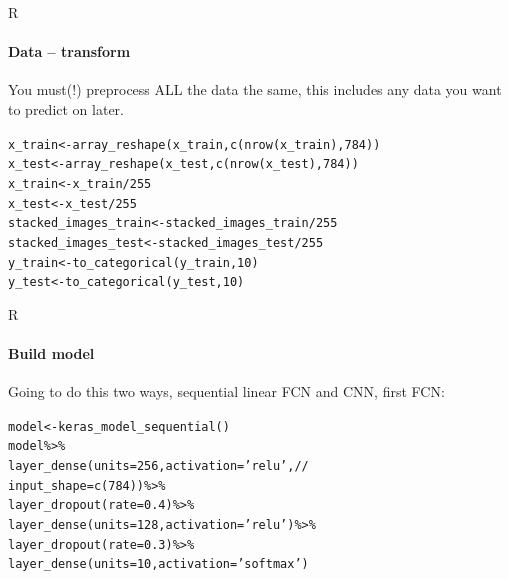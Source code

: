 \documentclass{beamer}
\begin{document}
\begin{darkframes}
    \begin{frame}{R}
      \framesubtitle{Data -- transform}
    \begin{block}{\small{You must(!) preprocess ALL the data the same, this includes any data you want to predict on later.}}
        \begin{alltt}
            x\_train <- array\_reshape(x\_train, c(nrow(x\_train), 784)) \\
            x\_test <- array\_reshape(x\_test, c(nrow(x\_test), 784)) \\
            x\_train <- x\_train / 255  \\
            x\_test <- x\_test / 255 \\
            stacked\_images\_train <- stacked\_images\_train / 255  \\
            stacked\_images\_test <- stacked\_images\_test / 255  \\
            y\_train <- to\_categorical(y\_train, 10) \\
            y\_test <- to\_categorical(y\_test, 10)
        \end{alltt}
    \end{block}
    \end{frame}
    
    \begin{frame}{R}
      \framesubtitle{Build model}
      \begin{block}
      {\small{Going to do this two ways, sequential linear FCN and CNN, first FCN:}}
        \small{\begin{alltt}
            model <- keras\_model\_sequential() \\
            model \%>\% \\
                layer\_dense(units = 256, activation = 'relu', // \\
                \text{     } input\_shape=c(784)) \%>\% \\
                layer\_dropout(rate = 0.4) \%>\% \\
                layer\_dense(units = 128, activation = 'relu') \%>\% \\
                layer\_dropout(rate = 0.3) \%>\% \\
                layer\_dense(units = 10, activation = 'softmax')
        \end{alltt}}
      \end{block}
    \end{frame}
    

\end{darkframes}
\end{document}
